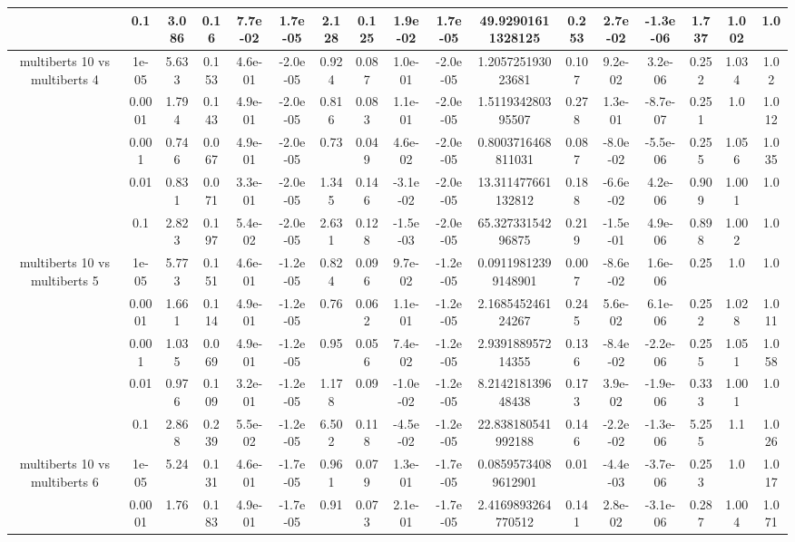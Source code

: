 \begin{tabular}{|c|c|c|c|c|c|c|c|c|c|c|c|c|c|c|c|c|}
 & 0.1 & 3.086 & 0.16 & 7.7e-02 & 1.7e-05 & 2.128 & 0.125 & 1.9e-02 & 1.7e-05 & 49.92901611328125 & 0.253 & 2.7e-02 & -1.3e-06 & 1.737 & 1.002 & 1.0 \\
\hline
\multirow{5}{*}{multiberts 10 vs multiberts 4} & 1e-05 & 5.633 & 0.153 & 4.6e-01 & -2.0e-05 & 0.924 & 0.087 & 1.0e-01 & -2.0e-05 & 1.205725193023681 & 0.107 & 9.2e-02 & 3.2e-06 & 0.252 & 1.034 & 1.02 \\
 & 0.0001 & 1.794 & 0.143 & 4.9e-01 & -2.0e-05 & 0.816 & 0.083 & 1.1e-01 & -2.0e-05 & 1.511934280395507 & 0.278 & 1.3e-01 & -8.7e-07 & 0.251 & 1.0 & 1.012 \\
 & 0.001 & 0.746 & 0.067 & 4.9e-01 & -2.0e-05 & 0.73 & 0.049 & 4.6e-02 & -2.0e-05 & 0.8003716468811031 & 0.087 & -8.0e-02 & -5.5e-06 & 0.255 & 1.056 & 1.035 \\
 & 0.01 & 0.831 & 0.071 & 3.3e-01 & -2.0e-05 & 1.345 & 0.146 & -3.1e-02 & -2.0e-05 & 13.311477661132812 & 0.188 & -6.6e-02 & 4.2e-06 & 0.909 & 1.001 & 1.0 \\
 & 0.1 & 2.823 & 0.197 & 5.4e-02 & -2.0e-05 & 2.631 & 0.128 & -1.5e-03 & -2.0e-05 & 65.32733154296875 & 0.219 & -1.5e-01 & 4.9e-06 & 0.898 & 1.002 & 1.0 \\
\hline
\multirow{5}{*}{multiberts 10 vs multiberts 5} & 1e-05 & 5.773 & 0.151 & 4.6e-01 & -1.2e-05 & 0.824 & 0.096 & 9.7e-02 & -1.2e-05 & 0.09119812399148901 & 0.007 & -8.6e-02 & 1.6e-06 & 0.25 & 1.0 & 1.0 \\
 & 0.0001 & 1.661 & 0.114 & 4.9e-01 & -1.2e-05 & 0.76 & 0.062 & 1.1e-01 & -1.2e-05 & 2.168545246124267 & 0.245 & 5.6e-02 & 6.1e-06 & 0.252 & 1.028 & 1.011 \\
 & 0.001 & 1.035 & 0.069 & 4.9e-01 & -1.2e-05 & 0.95 & 0.056 & 7.4e-02 & -1.2e-05 & 2.939188957214355 & 0.136 & -8.4e-02 & -2.2e-06 & 0.255 & 1.051 & 1.058 \\
 & 0.01 & 0.976 & 0.109 & 3.2e-01 & -1.2e-05 & 1.178 & 0.09 & -1.0e-02 & -1.2e-05 & 8.214218139648438 & 0.173 & 3.9e-02 & -1.9e-06 & 0.333 & 1.001 & 1.0 \\
 & 0.1 & 2.868 & 0.239 & 5.5e-02 & -1.2e-05 & 6.502 & 0.118 & -4.5e-02 & -1.2e-05 & 22.838180541992188 & 0.146 & -2.2e-02 & -1.3e-06 & 5.255 & 1.1 & 1.026 \\
\hline
\multirow{5}{*}{multiberts 10 vs multiberts 6} & 1e-05 & 5.24 & 0.131 & 4.6e-01 & -1.7e-05 & 0.961 & 0.079 & 1.3e-01 & -1.7e-05 & 0.08595734089612901 & 0.01 & -4.4e-03 & -3.7e-06 & 0.253 & 1.0 & 1.017 \\
 & 0.0001 & 1.76 & 0.183 & 4.9e-01 & -1.7e-05 & 0.91 & 0.073 & 2.1e-01 & -1.7e-05 & 2.4169893264770512 & 0.141 & 2.8e-02 & -3.1e-06 & 0.287 & 1.004 & 1.071 \\

\end{tabular}
